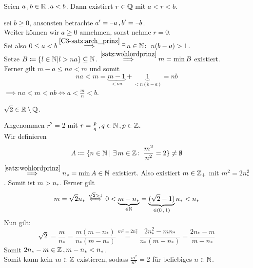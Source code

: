 \documentclass[../ana1.tex]{subfiles}
\begin{document}
\begin{satz}
	Seien \(a \operatorname{,} b \in \mathbb{R} \operatorname{,} a < b \). Dann existiert \( r \in \mathbb{Q} \) mit \(a < r < b \).
\end{satz}
\begin{bew}
	\obda  sei \(b \geq 0 \), ansonsten betrachte \( a^\prime = \minus{a} \ko b^\prime = \minus{b} \). \\
	Weiter können wir \(a \geq 0 \) annehmen, sonst nehme \(r = 0 \). \\
	Sei also \(0 \leq a < b \overset{\autoref{C3-satz:arch_prinz}}{\implies} \exists \, n \in \N \colon \; n(b-a) > 1 \). \\
	Setze \( B \coloneqq \{ l \in \mathbb{N} \vert l > na \} \subseteq \mathbb{N} \).
	\( \overset{\autoref{satz:wohlordprinz}}{\implies} m = \min B \) existiert.\\
	Ferner gilt \(m-a \leq na < m \) und somit
	\[ na < m = \underbrace{m-1}_{< na} + \underbrace{1}_{< n(b-a)} = nb \]
	\(\implies na < m  < nb \iff a < \frac{m}{n} < b\).
\end{bew}

\iftoggle{short}{}{\newpage}%

\begin{bem}
	\(\sqrt{2} \in \mathbb{R} \setminus \mathbb{Q} \).
\end{bem}
\begin{bew}
	Angenommen \( r^2 = 2 \) mit \( r = \frac{p}{q} \operatorname{,} q \in \mathbb{N} \operatorname{,} p \in \mathbb{Z} \). \\
	Wir definieren 
	\[A \coloneqq \{n \in \mathbb{N} \; \vert \; \exists \, m \in \mathbb{Z} \colon \; \frac{m^2}{n^2} = 2\} \neq \emptyset \]
	\(\overset{\autoref{satz:wohlordprinz}}{\implies} n_* = \min A \in \N \) existiert. Also existiert \( m \in \mathbb{Z}_+ \) mit
	\(m^2 = 2n_*^2\). Somit ist \(m > n_* \).
	Ferner gilt
	\[ m= \sqrt{2}n_* \overset{\sqrt{2} > 1}{\iff} 0 < \underbrace{m - n_*}_{\in \mathbb{N}} = \underbrace{(\sqrt{2} - 1)}_{\in (0 \operatorname{,} 1)} n_* < n_* \]
	Nun gilt: 
	\[ \sqrt{2} = \frac{m}{n_*} = \frac{m(m - n_*)}{n_*(m-n_*)} \overset{m^2 = 2n_*^2}{=} \frac{2n_*^2 - mn_*}{n_*(m - n_*)} = \frac{2n_* - m}{m - n_*} \]
	Somit \(2n_* - m \in \mathbb{Z} \operatorname{,} m - n_* < n_* \).  \\
	Somit kann kein \(m \in \mathbb{Z} \) existieren, sodass \(\frac{m^2}{n^2} = 2 \) für beliebiges \(n \in \mathbb{N} \).
\end{bew}
\end{document}
